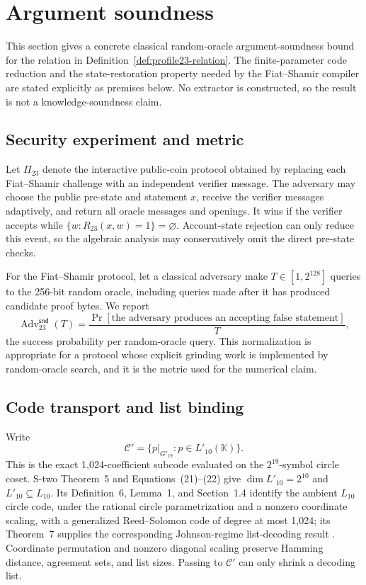 \section{Argument soundness}
\label{sec:soundness}

This section gives a concrete classical random-oracle argument-soundness
bound for the relation in Definition~\ref{def:profile23-relation}.  The
finite-parameter code reduction and the state-restoration property needed by
the Fiat--Shamir compiler are stated explicitly as premises below.  No
extractor is constructed, so the result is not a knowledge-soundness claim.

\subsection{Security experiment and metric}

Let \(\Pi_{23}\) denote the interactive public-coin protocol obtained by
replacing each Fiat--Shamir challenge with an independent verifier message.
The adversary may choose the public pre-state and statement \(x\), receive the
verifier messages adaptively, and return all oracle messages and openings.  It
wins if the verifier accepts while
\(
  \{w:R_{23}(x,w)=1\}=\varnothing
\).
Account-state rejection can only reduce this event, so the algebraic analysis
may conservatively omit the direct pre-state checks.

For the Fiat--Shamir protocol, let a classical adversary make
\(T\in[1,2^{128}]\) queries to the 256-bit random oracle, including queries
made after it has produced candidate proof bytes.  We report
\begin{equation}
 \operatorname{Adv}^{\mathsf{snd}}_{23}(T)
 =\frac{\Pr[\text{the adversary produces an accepting false statement}]}{T},
 \label{eq:work-normalized-soundness}
\end{equation}
the success probability per random-oracle query.  This normalization is
appropriate for a protocol whose explicit grinding work is implemented by
random-oracle search, and it is the metric used for the numerical claim.

\subsection{Code transport and list binding}

Write
\[
 \mathcal C'=
 \{p|_{G'_{19}}:p\in L'_{10}(\mathbb K)\}.
\]
This is the exact 1,024-coefficient subcode evaluated on the
\(2^{19}\)-symbol circle coset.  S-two Theorem~5 and
Equations~(21)--(22) give \(\dim L'_{10}=2^{10}\) and
\(L'_{10}\subseteq L_{10}\).  Its Definition~6, Lemma~1, and Section~1.4
identify the ambient \(L_{10}\) circle code, under the rational circle
parametrization and a nonzero coordinate scaling, with a generalized
Reed--Solomon code of degree at most 1,024; its Theorem~7 supplies the
corresponding Johnson-regime list-decoding result
\cite{CarmonEtAl2026Stwo}.  Coordinate permutation and nonzero diagonal
scaling preserve Hamming distance, agreement sets, and list sizes.  Passing
to \(\mathcal C'\) can only shrink a decoding list.

